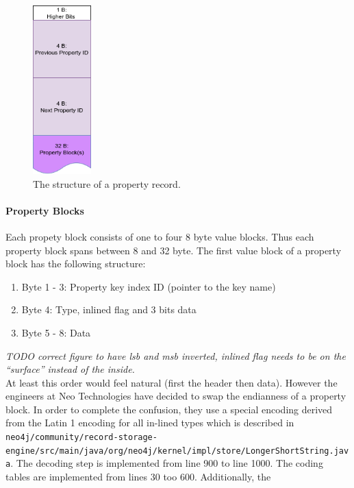 \documentclass[a4paper,10pt]{article}
\begin{document}
            \begin{figure}[htp]\label{prop}
                \begin{center}
                    \includegraphics[keepaspectratio,height=0.2\textheight,width=0.2\textwidth]{img/03_record/property/property.png}
                \end{center}
                \caption{The structure of a property record.} %
            \end{figure}
            
          \paragraph{Property Blocks} 
            Each propety block consists of one to four 8 byte value blocks. Thus each property block spans between 8 and 32 byte. The first value block of a property block has the following structure:
            \begin{enumerate}
                \item Byte 1 - 3: Property key index ID (pointer to the key name)
                \item Byte 4: Type, inlined flag and 3 bits data
                \item Byte 5 - 8: Data
            \end{enumerate}
            \textit{TODO correct figure to have lsb and msb inverted, inlined flag needs to be on the "`surface"' instead of the inside.} \\
            
            At least this order would feel natural (first the header then data). However the engineers at Neo Technologies have decided to swap the endianness of a property block. In order to complete the confusion, they use a special encoding derived from the Latin 1 encoding for all in-lined types which is described in \texttt{neo4j/community/record-storage-engine/src/main/java/org/neo4j/kernel/impl/store/LongerShortString.java}. The decoding step is implemented from line 900 to line 1000. The coding tables are implemented from lines 30 too 600. Additionally, the 
            
\end{document}
